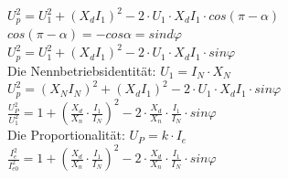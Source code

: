 \begin{minipage}{0.75 \linewidth}
$U_p^2 = U_1^2 + (X_d I_1)^2 - 2 \cdot U_1 \cdot X_d I_1 \cdot cos(\pi-\alpha)$\\

$cos(\pi - \alpha) = - cos\alpha = sind \varphi$ \\

$U_p^2 = U_1^2 + (X_d I_1)^2 - 2 \cdot U_1 \cdot X_d I_1 \cdot sin\varphi$\\

Die Nennbetriebsidentität: $U_1 = I_N \cdot X_N$ \\

$U_p^2 = (X_N I_N)^2+ (X_d I_1)^2 - 2 \cdot U_1 \cdot X_d I_1 \cdot sin\varphi$\\

$\frac{U_P^2}{U_1^2} = 1 + (\frac{X_d}{X_n} \cdot \frac{I_1}{I_N})^2 - 2 \cdot \frac{X_d}{X_n} \cdot \frac{I_1}{I_N} \cdot sin\varphi$\\

Die Proportionalität: $U_P = k \cdot I_e$ \\

$\frac{I_e^2}{I_{e0}^2} = 1 + (\frac{X_d}{X_n} \cdot \frac{I_1}{I_N})^2 - 2 \cdot \frac{X_d}{X_n} \cdot \frac{I_1}{I_N} \cdot sin\varphi$\\

\end{minipage}

